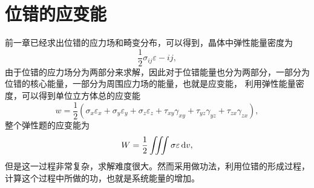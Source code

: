         \section{位错的应变能}
            前一章已经求出位错的应力场和畸变分布，可以得到，晶体中弹性能量密度为
            \begin{equation}
                \frac{1}{2}\sigma_{ij}\varepsilon-{ij},
            \end{equation}
            由于位错的应力场分为两部分来求解，因此对于位错能量也分为两部分，一部分为位错的核心能量，一部分为周围应力场的能量，也就是应变能，
            利用弹性能量密度，可以得到单位立方体总的应变能
            \begin{equation}
                w=\frac{1}{2}\left(\sigma_{x} \varepsilon_{x}+\sigma_{y} \varepsilon_{y}+\sigma_{z} \varepsilon_{z}+\tau_{x y} \gamma_{x y}+\tau_{y z} \gamma_{y z}+\tau_{z x} \gamma_{z x}\right),
            \end{equation}
            整个弹性题的应变能为
            \begin{equation}
                W=\frac{1}{2}\iiint\sigma\varepsilon\mathop{}\!\mathrm{d} v,
            \end{equation}
            但是这一过程非常复杂，求解难度很大。然而采用做功法，利用位错的形成过程，计算这个过程中所做的功，也就是系统能量的增加。

